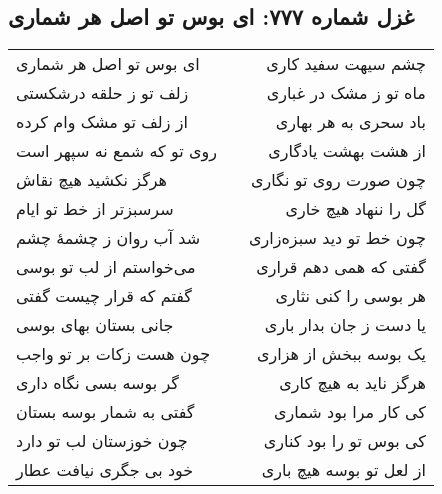 \begin{center}
\section*{غزل شماره ۷۷۷: ای بوس تو اصل هر شماری}
\label{sec:777}
\begin{longtable}{l p{0.5cm} r}
ای بوس تو اصل هر شماری
&&
چشم سیهت سفید کاری
\\
زلف تو ز حلقه درشکستی
&&
ماه تو ز مشک در غباری
\\
از زلف تو مشک وام کرده
&&
باد سحری به هر بهاری
\\
روی تو که شمع نه سپهر است
&&
از هشت بهشت یادگاری
\\
هرگز نکشید هیچ نقاش
&&
چون صورت روی تو نگاری
\\
سرسبزتر از خط تو ایام
&&
گل را ننهاد هیچ خاری
\\
شد آب روان ز چشمهٔ چشم
&&
چون خط تو دید سبزه‌زاری
\\
می‌خواستم از لب تو بوسی
&&
گفتی که همی دهم قراری
\\
گفتم که قرار چیست گفتی
&&
هر بوسی را کنی نثاری
\\
جانی بستان بهای بوسی
&&
یا دست ز جان بدار باری
\\
چون هست زکات بر تو واجب
&&
یک بوسه ببخش از هزاری
\\
گر بوسه بسی نگاه داری
&&
هرگز ناید به هیچ کاری
\\
گفتی به شمار بوسه بستان
&&
کی کار مرا بود شماری
\\
چون خوزستان لب تو دارد
&&
کی بوس تو را بود کناری
\\
خود بی جگری نیافت عطار
&&
از لعل تو بوسه هیچ باری
\\
\end{longtable}
\end{center}
